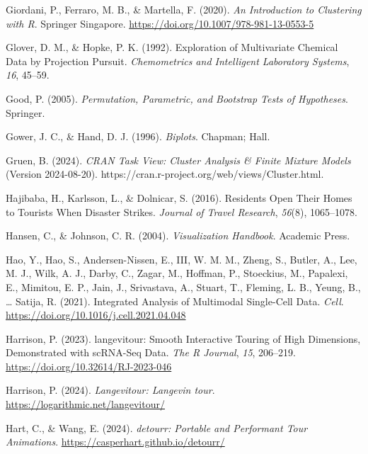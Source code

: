 \documentclass[
  letterpaper,
]{krantz}
\newlength{\cslhangindent}
\newenvironment{CSLReferences}[2] %
 {\begin{list}{}{%
  \setlength{\itemindent}{0pt}
  \setlength{\leftmargin}{0pt}
  \setlength{\parsep}{0pt}
  \ifodd #1
   \setlength{\leftmargin}{\cslhangindent}
   \setlength{\itemindent}{-1\cslhangindent}
  \fi
  \setlength{\itemsep}{#2\baselineskip}}}
 {\end{list}}
\begin{document}
\begin{CSLReferences}{1}{0}
Giordani, P., Ferraro, M. B., \& Martella, F. (2020). \emph{An
{I}ntroduction to {C}lustering with {R}}. Springer Singapore.
\url{https://doi.org/10.1007/978-981-13-0553-5}

Glover, D. M., \& Hopke, P. K. (1992). {E}xploration of {M}ultivariate
{C}hemical {D}ata by {P}rojection {P}ursuit. \emph{Chemometrics and
Intelligent Laboratory Systems}, \emph{16}, 45--59.

Good, P. (2005). \emph{Permutation, {P}arametric, and {B}ootstrap
{T}ests of {H}ypotheses}. Springer.

Gower, J. C., \& Hand, D. J. (1996). \emph{Biplots}. Chapman; Hall.

Gruen, B. (2024). \emph{CRAN {T}ask {V}iew: {C}luster {A}nalysis \&
{F}inite {M}ixture {M}odels} (Version 2024-08-20).
https://cran.r-project.org/web/views/Cluster.html.

Hajibaba, H., Karlsson, L., \& Dolnicar, S. (2016). Residents {O}pen
{T}heir {H}omes to {T}ourists {W}hen {D}isaster {S}trikes. \emph{Journal
of Travel Research}, \emph{56}(8), 1065--1078.

Hansen, C., \& Johnson, C. R. (2004). \emph{Visualization {H}andbook}.
Academic Press.

Hao, Y., Hao, S., Andersen-Nissen, E., III, W. M. M., Zheng, S., Butler,
A., Lee, M. J., Wilk, A. J., Darby, C., Zagar, M., Hoffman, P.,
Stoeckius, M., Papalexi, E., Mimitou, E. P., Jain, J., Srivastava, A.,
Stuart, T., Fleming, L. B., Yeung, B., \ldots{} Satija, R. (2021).
Integrated {A}nalysis of {M}ultimodal {S}ingle-{C}ell {D}ata.
\emph{Cell}. \url{https://doi.org/10.1016/j.cell.2021.04.048}

Harrison, P. (2023). {langevitour}: {S}mooth {I}nteractive {T}ouring of
{H}igh {D}imensions, {D}emonstrated with {scRNA-Seq} {D}ata. \emph{The R
Journal}, \emph{15}, 206--219.
\url{https://doi.org/10.32614/RJ-2023-046}

Harrison, P. (2024). \emph{Langevitour: Langevin tour}.
\url{https://logarithmic.net/langevitour/}

Hart, C., \& Wang, E. (2024). \emph{{detourr}: {P}ortable and
{P}erformant {T}our {A}nimations}.
\url{https://casperhart.github.io/detourr/}


\end{CSLReferences}
\end{document}

